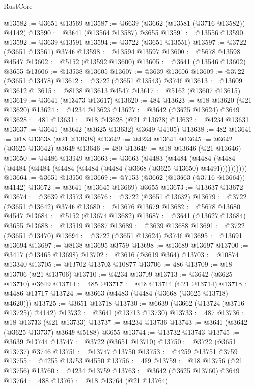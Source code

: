 \begin{lexlean}{RustCore}
\begin{coremodule}
@13582 := @3651 @13569
@13587 := @6639 (@3662 (@13581 (@3716 @13582)) @4142)
@13590 := @3641 (@13564 @13587) @3655
@13591 := @13556 @13590
@13592 := @3639 @13591
@13594 := @3722 (@3651 @13551)
@13597 := @3722 (@3651 @13561) @3746
@13598 := @13594 @13597
@13600 := @5678 @13598 @4547
@13602 := @5162 (@13592 @13600)
@13605 := @3641 (@13546 @13602) @3655
@13606 := @13538 @13605
@13607 := @3639 @13606
@13609 := @3722 (@3651 @13478)
@13612 := @3722 (@3651 @13543) @3746
@13613 := @13609 @13612
@13615 := @8138 @13613 @4547
@13617 := @5162 (@13607 @13615)
@13619 := @3641 (@13473 @13617)
@13620 := 484
@13623 := @18 @13620 (@21 @13620)
@13624 := @4234 @13623
@13627 := @3642 (@3625 @13624) @3649
@13628 := 481
@13631 := @18 @13628 (@21 @13628)
@13632 := @4234 @13631
@13637 := @3641 (@3642 (@3625 @13632) @3649 @4105)
@13638 := 482
@13641 := @18 @13638 (@21 @13638)
@13642 := @4234 @13641
@13645 := @3642 (@3625 @13642) @3649
@13646 := 480
@13649 := @18 @13646 (@21 @13646)
@13650 := @4486 @13649
@13663 := @3663
    (@4483
      (@4484 (@4484 (@4484 (@4484 (@4484 (@4484 (@4484 (@4484 (@3668 (@3625 @13650) @4491))))))))))
@13664 := @3651 @13650
@13669 := @7153 (@3662 (@13663 (@3716 @13664)) @4142)
@13672 := @3641 (@13645 @13669) @3655
@13673 := @13637 @13672
@13674 := @3639 @13673
@13676 := @3722 (@3651 @13632)
@13679 := @3722 (@3651 @13642) @3746
@13680 := @13676 @13679
@13682 := @5678 @13680 @4547
@13684 := @5162 (@13674 @13682)
@13687 := @3641 (@13627 @13684) @3655
@13688 := @13619 @13687
@13689 := @3639 @13688
@13691 := @3722 (@3651 @13470)
@13694 := @3722 (@3651 @13624) @3746
@13695 := @13691 @13694
@13697 := @8138 @13695 @3759
@13698 := @13689 @13697
@13700 := @3417 (@13465 @13698)
@13702 := @3616 (@3619 @364)
@13703 := @10874 @13340
@13705 := @13702 @13703 @10877
@13706 := 486
@13709 := @18 @13706 (@21 @13706)
@13710 := @4234 @13709
@13713 := @3642 (@3625 @13710) @3649
@13714 := 485
@13717 := @18 @13714 (@21 @13714)
@13718 := @4486 @13717
@13724 := @3663 (@4483 (@4484 (@3668 (@3625 @13718) @4620)))
@13725 := @3651 @13718
@13730 := @6639 (@3662 (@13724 (@3716 @13725)) @4142)
@13732 := @3641 (@13713 @13730)
@13733 := 487
@13736 := @18 @13733 (@21 @13733)
@13737 := @4234 @13736
@13743 := @3641 (@3642 (@3625 @13737) @3649 @5188) @3655
@13744 := @13732 @13743
@13745 := @3639 @13744
@13747 := @3722 (@3651 @13710)
@13750 := @3722 (@3651 @13737) @3746
@13751 := @13747 @13750
@13753 := @4259 @13751 @3759
@13755 := @4255 @13753 @4550
@13756 := 489
@13759 := @18 @13756 (@21 @13756)
@13760 := @4234 @13759
@13763 := @3642 (@3625 @13760) @3649
@13764 := 488
@13767 := @18 @13764 (@21 @13764)

\end{coremodule}
\end{lexlean}
